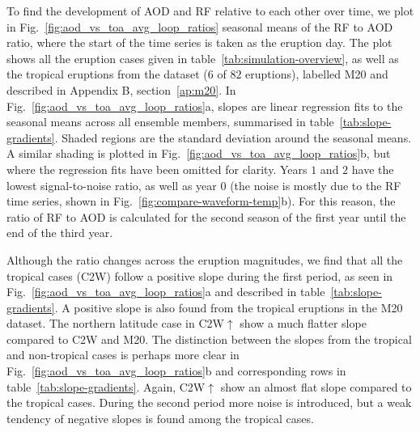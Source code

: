 \documentclass[draft]{agujournal2019}
\newcommand{\cwsn}{C2W\(\uparrow\)}
\begin{document}
To find the development of AOD and RF relative to each other over time, we plot in
Fig.~\ref{fig:aod_vs_toa_avg_loop_ratios} seasonal means of the RF to AOD ratio, where
the start of the time series is taken as the eruption day. The plot shows all the
eruption cases given in table~\ref{tab:simulation-overview}, as well as the tropical
eruptions from the  dataset (\(6\) of \(82\) eruptions),
labelled M20 and described in Appendix B, section~\ref{ap:m20}. In
Fig.~\ref{fig:aod_vs_toa_avg_loop_ratios}a, slopes are linear regression fits to the
seasonal means across all ensemble members, summarised in
table~\ref{tab:slope-gradients}. Shaded regions are the standard deviation around the
seasonal means. A similar shading is plotted in
Fig.~\ref{fig:aod_vs_toa_avg_loop_ratios}b, but where the regression fits have been
omitted for clarity. Years \(1\) and \(2\) have the lowest signal-to-noise ratio, as
well as year \(0\) (the noise is mostly due to the RF time series, shown in
Fig.~\ref{fig:compare-waveform-temp}b). For this reason, the ratio of RF to AOD is
calculated for the second season of the first year until the end of the third year.

Although the ratio changes across the eruption magnitudes, we find that all the tropical
cases (C2W) follow a positive slope during the first period, as seen in
Fig.~\ref{fig:aod_vs_toa_avg_loop_ratios}a and described in
table~\ref{tab:slope-gradients}. A positive slope is also found from the tropical
eruptions in the M20 dataset. The northern latitude case in \cwsn{} show a much flatter
slope compared to C2W and M20. The distinction between the slopes from the tropical and
non-tropical cases is perhaps more clear in Fig.~\ref{fig:aod_vs_toa_avg_loop_ratios}b
and corresponding rows in table~\ref{tab:slope-gradients}. Again, \cwsn{} show an almost
flat slope compared to the tropical cases. During the second period more noise is
introduced, but a weak tendency of negative slopes is found among the tropical cases.
\end{document}
